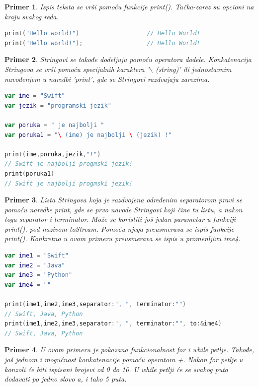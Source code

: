 \documentclass[a4paper]{article}
\newtheorem{primer}{Primer}[section]
\begin{document}
\begin{primer}
Ispis teksta se vrši pomoću funkcije print(). Tačka-zarez su opcioni na kraju svakog reda.
\end{primer}

\begin{lstlisting}[language=Swift, caption={Ispis teksta},frame=single, label=simple]
print("Hello world!")				    // Hello World!
print("Hello world!");					// Hello World!
\end{lstlisting}

\begin{primer}
Stringovi se takođe dodeljuju pomoću operatora dodele. Konkatenacija Stringova se vrši pomoću specijalnih karaktera '$\backslash$ (string)' ili jednostavnim navođenjem u naredbi 'print', gde se Stringovi razdvajaju zarezima.
\end{primer}

\begin{lstlisting}[language=Swift, caption={Stringovi i konkatenacija stringova},frame=single, label=simple]
var ime = "Swift"
var jezik = "programski jezik"

var poruka = " je najbolji "
var poruka1 = "\ (ime) je najbolji \ (jezik) !" 

print(ime,poruka,jezik,"!")
// Swift je najbolji progmski jezik!
print(poruka1) 
// Swift je najbolji progmski jezik!
\end{lstlisting}

\begin{primer}
Lista Stringova koja je razdvojena određenim separatorom pravi se pomoću naredbe print, gde se prvo navode Stringovi koji čine tu listu, a nakon toga separator i terminator. Može se koristiti još jedan parametar u funkciji print(), pod nazivom toStream. Pomoću njega preusmerava se ispis funkcije print(). Konkretno u ovom primeru preusmerava se ispis u promenljivu ime4.
\end{primer}

\begin{lstlisting}[language=Swift, caption={Lista stringova},frame=single, label=simple]
var ime1 = "Swift"
var ime2 = "Java"
var ime3 = "Python"
var ime4 = ""

print(ime1,ime2,ime3,separator:", ", terminator:"") 
// Swift, Java, Python
print(ime1,ime2,ime3,separator:", ", terminator:"", to:&ime4)
// Swift, Java, Python
\end{lstlisting}

\begin{primer}
U ovom primeru je pokazana funkcionalnost for i while petlje. Takođe, još jednom i mogućnost konkatenacije pomoću operatora +. Nakon for petlje u konzoli će biti ispisani brojevi od 0 do 10. U while petlji će se svakog puta dodavati po jedno slovo a, i tako 5 puta.
\end{primer}
\end{document}
